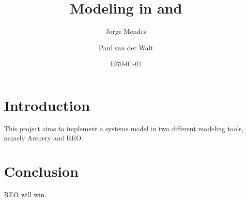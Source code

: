 \documentclass[a4paper]{article}
\author{Jorge Mendes \and Paul van der Walt}
\date{\today}
\title{Modeling in \ar and \re}
\newcommand{\ar}{Archery\xspace}
\newcommand{\re}{REO\xspace}
\begin{document}
\maketitle

\section{Introduction}

This project aims to implement a systems model in two different modeling tools,
namely \ar and \re.


\section{Conclusion}

\re will win. 
\end{document}

